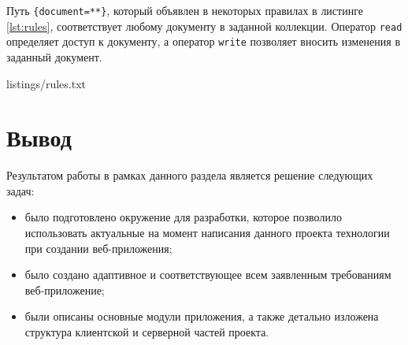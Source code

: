 Путь \verb|{document=**}|, который объявлен в некоторых правилах в листинге \ref{lst:rules}, соответствует любому документу в заданной коллекции. Оператор \texttt{read} определяет доступ к документу, а оператор \texttt{write} позволяет вносить изменения в заданный документ.

\clearpage


{listings/rules.txt}

\clearpage

\section{Вывод}

Результатом работы в рамках данного раздела является решение следующих задач:

\begin{itemize}
	\item было подготовлено окружение для разработки, которое позволило использовать актуальные на момент написания данного проекта технологии при создании веб-приложения;
	\item было создано адаптивное и соответствующее всем заявленным требованиям веб-приложение;
	\item были описаны основные модули приложения, а также детально изложена структура клиентской и серверной частей проекта.
\end{itemize}

